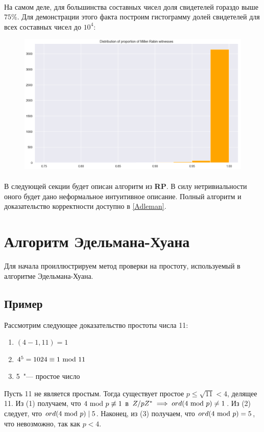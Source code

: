 \documentclass[12pt]{article}
\theoremstyle{definition}
\numberwithin{Def}{section}
\numberwithin{Th}{section}
\numberwithin{St}{section}
\numberwithin{Cor}{section}
\begin{document}
\paragraph{} На самом деле, для большинства составных чисел доля свидетелей
гораздо выше $75\%$. Для демонстрации этого факта построим гистограмму долей
свидетелей для всех составных чисел до $10^4$:

\begin{figure}[H]
 	\includegraphics[width=\linewidth]{miller-rabin.png}
\end{figure}

\paragraph{}В следующей секции будет описан алгоритм из \textbf{RP}. В силу
нетривиальности оного будет дано неформальное интуитивное описание. Полный
алгоритм и доказательство корректности доступно в \ref{Adleman}.

\section{Алгоритм Эдельмана-Хуана}

Для начала проиллюстрируем метод проверки на простоту, используемый в алгоритме
Эдельмана-Хуана.

\subsection{Пример}

Рассмотрим следующее доказательство простоты числа 11:
\begin{enumerate}[(1)]
	\item $(4-1,11)=1$
	\item $4^5=1024\equiv1\ \mathrm{mod}\ 11$
	\item 5~"--- простое число
\end{enumerate}
Пусть 11 не является простым. Тогда существует простое $p\leqslant\sqrt{11}<4$,
делящее 11. Из (1) получаем, что
$4\ \mathrm{mod}\ p\not\equiv1$ в $Z/pZ^*\implies ord(4\ \mathrm{mod}\ p)\neq 1$. Из (2) следует,
что $ord(4\ \mathrm{mod}\ p)\mid 5$. Наконец, из (3) получаем, что $ord(4\ \mathrm{mod}\ p)=5$,
что невозможно, так как $p<4$.
\end{document}
